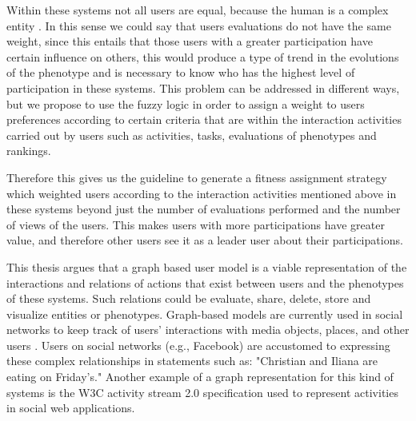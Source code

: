 \par Within these systems not all users are equal, because the human is a complex
entity \cite{mitchell2009complexity}. In this sense we could say that users
evaluations do not have the same weight, since this entails
that those users with a greater participation have certain influence on others,
this would produce a
type of trend in the evolutions of the phenotype and is necessary to know who
has the highest level of participation in these systems. This problem can be
addressed in different ways, but we propose to use the fuzzy logic
\cite{Zadeh1973}\cite{TakagiSugeno1983}\cite{ohsaki1998input} in order to assign
a weight to users preferences according to certain criteria that are within the
interaction activities carried out by users such as activities, tasks,
evaluations of phenotypes and rankings.

\par Therefore this gives us the guideline to generate a fitness assignment
strategy which weighted users according to the interaction activities mentioned
above in these systems beyond just the number of evaluations performed and the
number of views of the users. This makes users with more participations have
greater value, and therefore other users see it as a leader user about their
participations.

\par This thesis argues that a graph based user model is a viable representation of
the interactions and relations of actions that exist between users
and the phenotypes of these systems. Such relations could be evaluate, share, delete,
store and visualize entities or phenotypes. Graph-based models are currently
used in social networks to
keep track of users' interactions with media objects, places, and other users
\cite{bondy1976graph}\cite{miller2013graph}\cite{holzschuher2013performance}. Users on
social networks (e.g., Facebook) are accustomed to expressing these
complex relationships in statements such as: "Christian and Iliana are eating on
Friday's." Another example of a graph representation for this kind
of systems is the W3C activity stream 2.0 specification used to
represent activities in social web applications.

